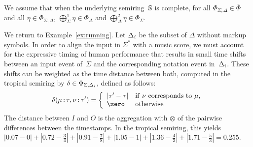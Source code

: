 %
%
We assume that when the underlying semiring~$\mathbb{S}$ is complete,
for all $\Phi_{\Sigma, \Delta} \in \bar\Phi$
and all $\eta \in \Phi_{\Sigma, \Delta}$,
$\bigoplus^1_\Sigma \eta \in \Phi_{\Delta}$ and
$\bigoplus^2_\Delta \eta \in \Phi_{\Sigma}$.


\begin{example}\label{distance-time}
We return to Example~\ref{ex:running}.
Let $\Deltai$ be the subset of $\Delta$ without markup symbols.
In order to align the input in $\Sigma^*$ %
with a music score, %
we must account for
the expressive timing of human performance that
results in small time shifts between an input event of~$\Sigma$ and the corresponding
notation event in~$\Deltai$.
These shifts can be weighted as the time distance between both,
computed in the tropical semiring by $\delta \in \Phi_{\Sigma, \Deltai}$,
defined as follows:
\[
\delta(\mu\ts{\tau}, \nu\ts{\tau'}) =
\left\{
\begin{array}{ll}
   | \tau' - \tau | & \mathrm{if}\  \nu \rm{\ corresponds\ to\ } \mu,\\
   \zero  & \mathrm{otherwise}
\end{array}
\right.
\]
The distance between $I$ and $O$ is the  aggregation with $\otimes$
of the pairwise differences between the
timestamps. In the tropical semiring, this yields
$|0.07 - 0| + |0.72 - \frac{3}{4}| + |0.91- \frac{7}{8} | +
|1.05-1| + |1.36-\frac{4}{3}| + |1.71-\frac{5}{3}|= 0.255$.
\endex
\end{example}


